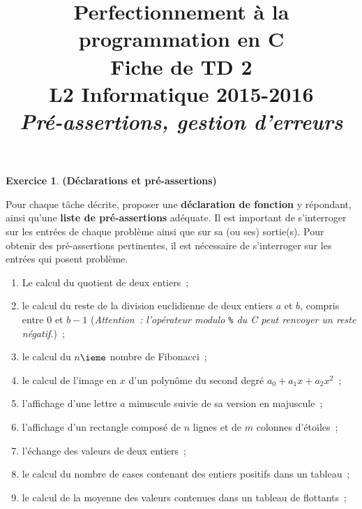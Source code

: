 \documentclass[12pt]{article}
\date{}
\title{{\bf Perfectionnement à la programmation en {\sf C}} \\
    Fiche de TD 2 \\
    {\small L2 Informatique 2015-2016} \\
    {\it \small Pré-assertions, gestion d'erreurs}}
\theoremstyle{definition}
\newtheorem{Exercice}{Exercice}
\begin{document}
\maketitle

\begin{Exercice} {\bf (Déclarations et pré-assertions)}\smallskip

Pour chaque tâche décrite, proposer une {\bf déclaration de fonction} y
répondant, ainsi qu'une {\bf liste de pré-assertions} adéquate. Il est 
important de s'interroger sur les entrées de chaque problème ainsi que 
sur sa (ou ses) sortie(s). Pour obtenir des pré-assertions pertinentes, 
il est nécessaire de s'interroger sur les entrées qui posent problème.

\begin{enumerate}
    \item Le calcul du quotient de deux entiers~;
    \smallskip
    
    \item le calcul du reste de la division euclidienne de deux entiers 
    $a$ et $b$, compris entre $0$ et $b - 1$ ({\it Attention~: l'opérateur 
    modulo {\tt \%} du {\sf C} peut renvoyer un reste négatif.})~;
    \smallskip
    
    \item le calcul du $n\ieme$ nombre de Fibonacci~;
    \smallskip
    
    \item le calcul de l'image en $x$ d'un polynôme du second degré
    $a_0 + a_1 x + a_2 x^2$~;
    \smallskip
    
    \item l'affichage d'une lettre $a$ minuscule suivie de sa version 
    en majuscule~;
    \smallskip
    
    \item l'affichage d'un rectangle composé de $n$ lignes et de $m$
    colonnes d'étoiles~;
    \smallskip
    
    \item l'échange des valeurs de deux entiers~;
    \smallskip
    
    \item le calcul du nombre de cases contenant des entiers positifs 
    dans un tableau~;
    \smallskip
    
    \item le calcul de la moyenne des valeurs contenues dans un tableau 
    de flottants~;
    \smallskip
    

\end{enumerate}
\end{Exercice}
\end{document}
